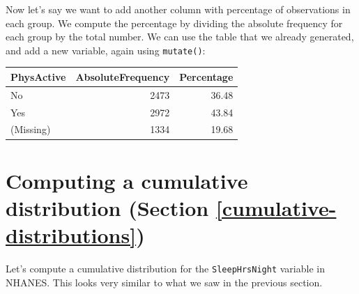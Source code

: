 \documentclass[12pt,]{book}
\newenvironment{Shaded}{\begin{snugshade}}{\end{snugshade}}
\newcommand{\DataTypeTok}[1]{\textcolor[rgb]{0.13,0.29,0.53}{#1}}
\newcommand{\DecValTok}[1]{\textcolor[rgb]{0.00,0.00,0.81}{#1}}
\newcommand{\KeywordTok}[1]{\textcolor[rgb]{0.13,0.29,0.53}{\textbf{#1}}}
\newcommand{\NormalTok}[1]{#1}
\newcommand{\OperatorTok}[1]{\textcolor[rgb]{0.81,0.36,0.00}{\textbf{#1}}}
\newcommand{\StringTok}[1]{\textcolor[rgb]{0.31,0.60,0.02}{#1}}
\begin{document}
Now let's say we want to add another column with percentage of observations in each group. We compute the percentage by dividing the absolute frequency for each group by the total number. We can use the table that we already generated, and add a new variable, again using \texttt{mutate()}:

\begin{Shaded}
\end{Shaded}

\begin{tabular}{l|r|r}
\hline
PhysActive & AbsoluteFrequency & Percentage\\
\hline
No & 2473 & 36.48\\
\hline
Yes & 2972 & 43.84\\
\hline
(Missing) & 1334 & 19.68\\
\hline
\end{tabular}

\hypertarget{computing-a-cumulative-distribution-section-refcumulative-distributions}{%
\section{Computing a cumulative distribution (Section \ref{cumulative-distributions})}\label{computing-a-cumulative-distribution-section-refcumulative-distributions}}

Let's compute a cumulative distribution for the \texttt{SleepHrsNight} variable in NHANES. This looks very similar to what we saw in the previous section.
\end{document}
